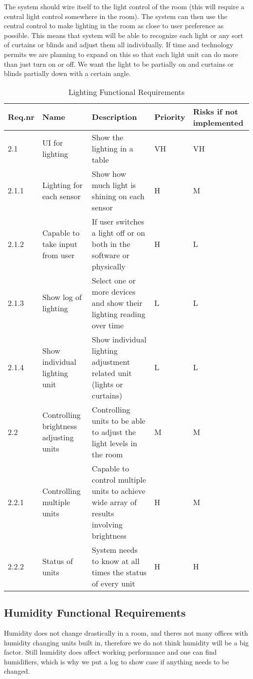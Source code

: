 \documentclass[../document]{subfiles}
\begin{document}
The system should wire itself to the light control of the room (this will require a central light control somewhere in the room). The system can then use the central control to make lighting in the room as close to user preference as possible. This means that system will be able to recognize each light or any sort of curtains or blinds and adjust them all individually. If time and technology permits we are planning to expand on this so that each light unit can do more than just turn on or off. We want the light to be partially on and curtains or blinds partially down with a certain angle.


\begin{table}[H]
\caption{Lighting Functional Requirements}
\centering
\begin{tabularx}{\textwidth}{|l|X|X|l|X|}
\hline
Req.nr
&Name
&Description
&Priority
&Risks if not implemented
\\ \hline 2.1
&UI for lighting
&Show the lighting in a table
&VH
&VH
\\ \hline 2.1.1
&Lighting for each sensor
&Show how much light is shining on each sensor
&H
&M
\\ \hline 2.1.2
&Capable to take input from user
&If user switches a light off or on both in the software or physically
&H
&L
\\ \hline 2.1.3
&Show log of lighting
&Select one or more devices and show their lighting reading over time
&L
&L
\\ \hline 2.1.4
&Show individual lighting unit
&Show individual lighting adjustment related unit (lights or curtains)
&L
&L
\\ \hline 2.2
&Controlling brightness adjusting units
&Controlling units to be able to adjust the light levels in the room
&M
&M
\\ \hline 2.2.1
&Controlling multiple units
&Capable to control multiple units to achieve wide array of results involving brightness 
&H
&M
\\ \hline 2.2.2
&Status of units
&System needs to know at all times the status of every unit
&H
&H
\\ \hline 
\end{tabularx}
\end{table}

\subsection{Humidity Functional Requirements}
Humidity does not change drastically in a room, and theres not many offices with humidity changing units built in, therefore we do not think humidity will be a big factor. Still humidity does affect working performance and one can find humidifiers, which is why we put a log to show case if anything needs to be changed. 
\end{document}
